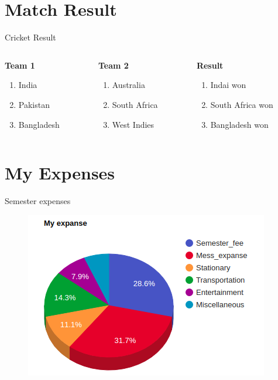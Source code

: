 \documentclass{beamer}
\begin{document}
\section{Match Result}
\begin{frame}{Cricket Result}
\begin{columns}
\begin{column}[T]{0.3\textwidth}
\vspace{0.5cm}
\textbf {Team 1}
\begin{enumerate}
  \item India
  \item Pakistan
  \item Bangladesh
\end{enumerate}
\end{column}
\begin{column}[T]{0.3\textwidth}
\vspace{0.5cm}
\textbf {Team 2}
\begin{enumerate}
  \item Australia
  \item South Africa
  \item West Indies
\end{enumerate}
\end{column}
\begin{column}[T]{0.3\textwidth}
\textbf {Result}
\begin{enumerate}
  \item Indai won
  \item South Africa won
  \item Bangladesh won
\end{enumerate}
\end{column}
\end{columns}	




\end{frame}

\section{My Expenses}
\begin{frame}{Semester expenses}
\begin{figure}
\centering
\includegraphics[scale=0.5]{pie_chart.png}
\end{figure}
\end{frame}
\end{document}
